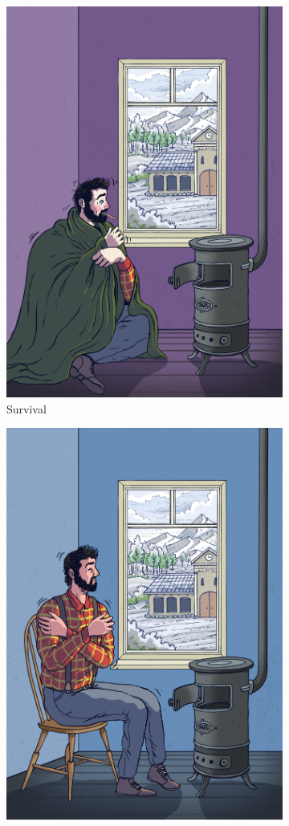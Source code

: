 \documentclass[10pt,letterpaper]{article}
\begin{document}
\begin{figure}[ht!]
   \begin{subfigure}[t]{0.5\textwidth}
      \centering
      \includegraphics[width=0.8\linewidth]{figures/figure_1_a.jpg}
      \caption{Survival}\label{fig:illu_survival}
   \end{subfigure}
   \hfill
   \begin{subfigure}[t]{0.5\textwidth}
      \centering
      \includegraphics[width=0.8\linewidth]{figures/figure_1_b.jpg}

\end{subfigure}
\end{figure}
\end{document}
